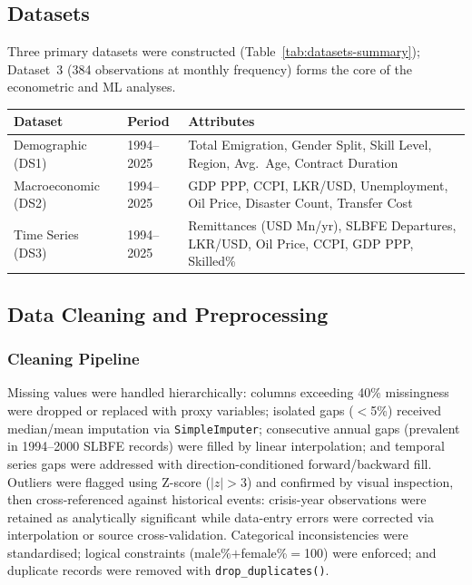 \documentclass[sigconf]{acmart}
\begin{document}
\subsection{Datasets}
Three primary datasets were constructed (Table~\ref{tab:datasets-summary}); Dataset~3 (384 observations at monthly frequency) forms the core of the econometric and ML analyses. 

\begin{minipage}{\columnwidth} %
{\small
{}
\label{tab:datasets-summary}
\begin{tabular}{|p{1.8cm}|p{1.2cm}|p{4.6cm}|}
\hline
\textbf{Dataset} & \textbf{Period} & \textbf{Attributes} \\
\hline
Demographic (DS1) & 1994--2025 & Total Emigration, Gender Split, Skill Level, Region, Avg.\ Age, Contract Duration \\
\hline
Macroeconomic (DS2) & 1994--2025 & GDP PPP, CCPI, LKR/USD, Unemployment, Oil Price, Disaster Count, Transfer Cost \\
\hline
Time Series (DS3) & 1994--2025 & Remittances (USD Mn/yr), SLBFE Departures, LKR/USD, Oil Price, CCPI, GDP PPP, Skilled\% \\
\hline
\end{tabular}
}
\end{minipage} %
\vspace{-6pt}

\subsection{Data Cleaning and Preprocessing}

\subsubsection{Cleaning Pipeline}
Missing values were handled hierarchically: columns exceeding 40\% missingness were dropped or replaced with proxy variables; isolated gaps ($<$5\%) received median/mean imputation via \texttt{SimpleImputer}; consecutive annual gaps (prevalent in 1994--2000 SLBFE records) were filled by linear interpolation; and temporal series gaps were addressed with direction-conditioned forward/backward fill. Outliers were flagged using Z-score ($|z|>3$) and confirmed by visual inspection, then cross-referenced against historical events: crisis-year observations were retained as analytically significant while data-entry errors were corrected via interpolation or source cross-validation. Categorical inconsistencies were standardised; logical constraints (male\%$+$female\%$=$100) were enforced; and duplicate records were removed with \texttt{drop\_duplicates()}.
\end{document}
